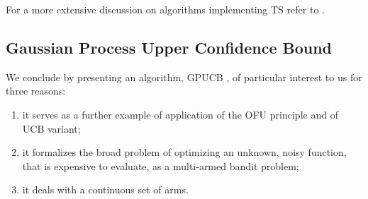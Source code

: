 For a more extensive discussion on algorithms implementing \gls{TS}  refer to \cite{russo2018tutorial}.
\\

\subsection{Gaussian Process Upper Confidence Bound}
We conclude by presenting an algorithm, \gls{GPUCB} \cite{srinivas2010gaussian}, of particular interest to us for three reasons: 
\begin{enumerate}
\item it serves as a further example of application of the \gls{OFU} principle and of \gls{UCB} variant;
\item it formalizes the broad problem of optimizing an unknown, noisy function, that is expensive to evaluate, as a multi-armed bandit problem;
\item it deals with a continuous set of arms.
\end{enumerate}

